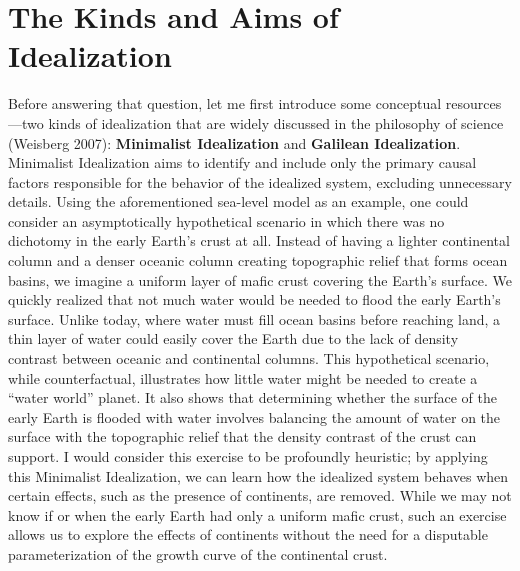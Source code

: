 \documentclass[11pt]{article}
\begin{document}
\section*{The Kinds and Aims of Idealization}

Before answering that question, let me first introduce some conceptual resources---two kinds of idealization that are widely discussed in the philosophy of science (Weisberg 2007): \textbf{Minimalist Idealization} and \textbf{Galilean Idealization}. Minimalist Idealization aims to identify and include only the primary causal factors responsible for the behavior of the idealized system, excluding unnecessary details. Using the aforementioned sea-level model as an example, one could consider an asymptotically hypothetical scenario in which there was no dichotomy in the early Earth's crust at all. Instead of having a lighter continental column and a denser oceanic column creating topographic relief that forms ocean basins, we imagine a uniform layer of mafic crust covering the Earth's surface. We quickly realized that not much water would be needed to flood the early Earth's surface. Unlike today, where water must fill ocean basins before reaching land, a thin layer of water could easily cover the Earth due to the lack of density contrast between oceanic and continental columns. This hypothetical scenario, while counterfactual, illustrates how little water might be needed to create a ``water world'' planet. It also shows that determining whether the surface of the early Earth is flooded with water involves balancing the amount of water on the surface with the topographic relief that the density contrast of the crust can support. I would consider this exercise to be profoundly heuristic; by applying this Minimalist Idealization, we can learn how the idealized system behaves when certain effects, such as the presence of continents, are removed. While we may not know if or when the early Earth had only a uniform mafic crust, such an exercise allows us to explore the effects of continents without the need for a disputable parameterization of the growth curve of the continental crust.
\end{document}
